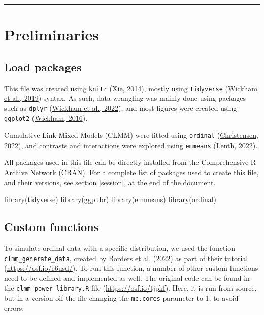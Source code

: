 \documentclass[
  bookmarksnumbered]{article}
\newenvironment{Shaded}{\begin{snugshade}}{\end{snugshade}}
\newcommand{\FunctionTok}[1]{\textcolor[rgb]{0.94,0.94,0.56}{#1}}
\newcommand{\NormalTok}[1]{\textcolor[rgb]{0.80,0.80,0.80}{#1}}
\begin{document}
\begin{center}\rule{0.5\linewidth}{0.5pt}\end{center}

\hypertarget{preliminaries}{%
\section{Preliminaries}\label{preliminaries}}

\hypertarget{load-packages}{%
\subsection{Load packages}\label{load-packages}}

This file was created using \texttt{knitr} (\protect\hyperlink{ref-knitrcit}{Xie, 2014}), mostly using \texttt{tidyverse} (\protect\hyperlink{ref-tidyversecit}{Wickham et al., 2019}) syntax. As such, data wrangling was mainly done using packages such as \texttt{dplyr} (\protect\hyperlink{ref-dplyrcit}{Wickham et al., 2022}), and most figures were created using \texttt{ggplot2} (\protect\hyperlink{ref-ggplotcit}{Wickham, 2016}).

Cumulative Link Mixed Models (CLMM) were fitted using \texttt{ordinal} (\protect\hyperlink{ref-ordinalcit}{Christensen, 2022}), and contrasts and interactions were explored using \texttt{emmeans} (\protect\hyperlink{ref-emmeanscit}{Lenth, 2022}).

All packages used in this file can be directly installed from the Comprehensive R Archive Network (\href{https://cran.r-project.org/}{CRAN}). For a complete list of packages used to create this file, and their versions, see section \ref{session}, at the end of the document.

\begin{Shaded}
\begin{Highlighting}[]
\FunctionTok{library}\NormalTok{(tidyverse)}
\FunctionTok{library}\NormalTok{(ggpubr)}
\FunctionTok{library}\NormalTok{(emmeans)}
\FunctionTok{library}\NormalTok{(ordinal)}
\end{Highlighting}
\end{Shaded}

\hypertarget{custom-functions}{%
\subsection{Custom functions}\label{custom-functions}}

To simulate ordinal data with a specific distribution, we used the function \texttt{clmm\_generate\_data}, created by Borders et al. (\protect\hyperlink{ref-bordersPowerAnalysisOrdinal2022}{2022}) as part of their tutorial (\url{https://osf.io/e6usd/}). To run this function, a number of other custom functions need to be defined and implemented as well. The original code can be found in the \texttt{clmm-power-library.R} file (\url{https://osf.io/tjpkf}). Here, it is run from source, but in a version oif the file changing the \texttt{mc.cores} parameter to 1, to avoid errors.
\end{document}
